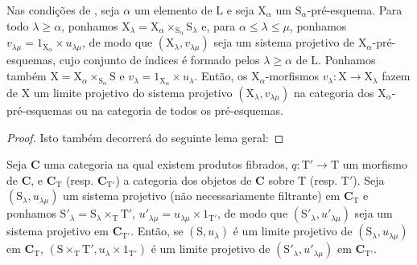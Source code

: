 \begin{proposition}[8.2.5]
\label{IV.8.2.5}
Nas condições de , seja $\alpha$ um elemento de $\mathrm{L}$ e seja $\mathrm{X}_\alpha$ um $\mathrm{S}_\alpha$-pré-esquema.
Para todo $\lambda\geqslant\alpha$, ponhamos $\mathrm{X}_\lambda=\mathrm{X}_\alpha\times_{\mathrm{S}_\alpha}\mathrm{S}_\lambda$ e, para $\alpha\leqslant\lambda\leqslant\mu$, ponhamos $v_{\lambda\mu}=1_{\mathrm{X}_\alpha}\times u_{\lambda\mu}$, de modo que $(\mathrm{X}_\lambda,v_{\lambda\mu})$ seja um sistema projetivo de $\mathrm{X}_\alpha$-pré-esquemas, cujo conjunto de índices é formado pelos $\lambda\geqslant\alpha$ de $\mathrm{L}$.
Ponhamos também $\mathrm{X}=\mathrm{X}_\alpha\times_{\mathrm{S}_\alpha}\mathrm{S}$ e $v_\lambda=1_{\mathrm{X}_\alpha}\times u_\lambda$.
Então, os $\mathrm{X}_\alpha$-morfismos $v_\lambda:\mathrm{X}\to\mathrm{X}_\lambda$ fazem de $\mathrm{X}$ um limite projetivo do sistema projetivo $(\mathrm{X}_\lambda,v_{\lambda\mu})$ na categoria dos $\mathrm{X}_\alpha$-pré-esquemas ou na categoria de todos os pré-esquemas.
\end{proposition}

\begin{proof}
Isto também decorrerá do seguinte lema geral:
\end{proof}

\begin{lemma}[8.2.6]
\label{IV.8.2.6}
Seja $\mathbf{C}$ uma categoria na qual existem produtos fibrados, $q:\mathrm{T}'\to\mathrm{T}$ um morfismo de $\mathbf{C}$, e $\mathbf{C}_\mathrm{T}$ (resp. $\mathbf{C}_{\mathrm{T}'}$) a categoria dos objetos de $\mathbf{C}$ sobre
$\mathrm{T}$ (resp. $\mathrm{T}'$).
Seja $(\mathrm{S}_\lambda,u_{\lambda\mu})$ um sistema projetivo (não necessariamente filtrante) em $\mathbf{C}_\mathrm{T}$ e ponhamos $\mathrm{S}'_\lambda=\mathrm{S}_\lambda\times_\mathrm{T}\mathrm{T}'$, $u'_{\lambda\mu}=u_{\lambda\mu}\times 1_{\mathrm{T}'}$, de modo que $(\mathrm{S}'_\lambda,u'_{\lambda\mu})$ seja um sistema projetivo em $\mathbf{C}_{\mathrm{T}'}$.
Então, se $(\mathrm{S},u_\lambda)$ é um limite projetivo de $(\mathrm{S}_\lambda,u_{\lambda\mu})$ em $\mathbf{C}_\mathrm{T}$, $(\mathrm{S}\times_\mathrm{T}\mathrm{T}',u_\lambda\times 1_{\mathrm{T}'})$ é um limite projetivo de $(\mathrm{S}'_\lambda,u'_{\lambda\mu})$ em $\mathbf{C}_{\mathrm{T}'}$.
\end{lemma}

